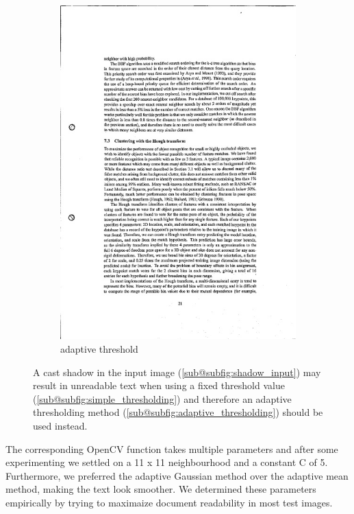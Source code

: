 \documentclass[bibliography=totoc]{scrartcl}
\begin{document}
\begin{figure}[hb!]
\begin{subfigure}[t]{0.28\linewidth}
		\includegraphics[width=\linewidth]{imgs/threshold/bad_lighting_adaptive.jpg}
		\caption{adaptive threshold}
		\label{subfig:adaptive_thresholding}
	\end{subfigure}
	\caption{A cast shadow in the input image (\ref{sub@subfig:shadow_input}) may result in unreadable text when using a fixed threshold value (\ref{sub@subfig:simple_thresholding}) and therefore an adaptive thresholding method  (\ref{sub@subfig:adaptive_thresholding}) should be used instead.}
	\label{fig:thresholding}
\end{figure}


The corresponding OpenCV function takes multiple parameters and after some experimenting we settled on a 11 x 11 neighbourhood and a constant C of 5.
Furthermore, we preferred the adaptive Gaussian method over the adaptive mean method, making the text look smoother.
We determined these parameters empirically by trying to maximaize document readability in most test images.
\end{document}
